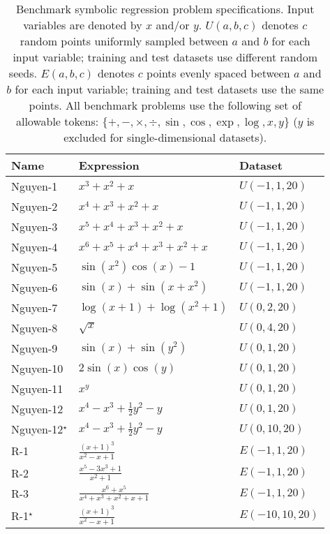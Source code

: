 \documentclass{article}
\begin{document}
\begin{table}[htbp]
    \centering
    \caption{Benchmark symbolic regression problem specifications.
Input variables are denoted by $x$ and/or $y$.
$U\left(a, b, c\right)$ denotes $c$ random points uniformly sampled between $a$ and $b$ for each input variable; training and test datasets use different random seeds.
$E\left(a, b, c\right)$ denotes $c$ points evenly spaced between $a$ and $b$ for each input variable; training and test datasets use the same points.
All benchmark problems use the following set of allowable tokens: $\{ +, -, \times, \div, \sin, \cos, \exp, \log, x, y \}$ ($y$ is excluded for single-dimensional datasets).}
    \begin{tabular}{lll}
    Name  & Expression & Dataset \\
    \midrule
    Nguyen-1 & $x^3+x^2+x$ & $U\left(-1, 1, 20\right)$ \\
    Nguyen-2 & $x^4+x^3+x^2+x$ & $U\left(-1, 1, 20\right)$ \\
    Nguyen-3 & $x^5+x^4+x^3+x^2+x$ & $U\left(-1, 1, 20\right)$ \\
    Nguyen-4 & $x^6+x^5+x^4+x^3+x^2+x$ & $U\left(-1, 1, 20\right)$ \\
    Nguyen-5 & $\sin(x^2)\cos(x)-1$ & $U\left(-1, 1, 20\right)$ \\
    Nguyen-6 & $\sin(x)+\sin(x+x^2)$ & $U\left(-1, 1, 20\right)$ \\
    Nguyen-7 & $\log(x+1)+\log(x^2+1)$ & $U\left(0, 2, 20\right)$ \\
    Nguyen-8 & $\sqrt{x}$ & $U\left(0, 4, 20\right)$ \\
    Nguyen-9 & $\sin(x)+\sin(y^2)$ & $U\left(0, 1, 20\right)$ \\
    Nguyen-10 & $2\sin(x)\cos(y)$ & $U\left(0, 1, 20\right)$ \\
    Nguyen-11 & $x^y$ & $U\left(0, 1, 20\right)$ \\
    Nguyen-12 & $x^4-x^3+\frac{1}{2}y^2-y$ & $U\left(0, 1, 20\right)$ \\
    Nguyen-12$^\star$ & $x^4-x^3+\frac{1}{2}y^2-y$ & $U\left(0, 10, 20\right)$ \\
    \midrule
    R-1    & $\frac{{\left(x+1\right)}^3}{{x}^2-x+1}$ & $E\left(-1,1,20\right)$ \\
    R-2    & $\frac{{x}^5-3{x}^3+1}{{x}^2+1}$ & $E\left(-1,1,20\right)$ \\
    R-3    & $\frac{{x}^6+{x}^5}{{x}^4+{x}^3+{x}^2+x+1}$ & $E\left(-1,1,20\right)$ \\
    R-1$^\star$   & $\frac{{\left(x+1\right)}^3}{{x}^2-x+1}$ & $E\left(-10,10,20\right)$ \\

\end{tabular}
\end{table}
\end{document}
